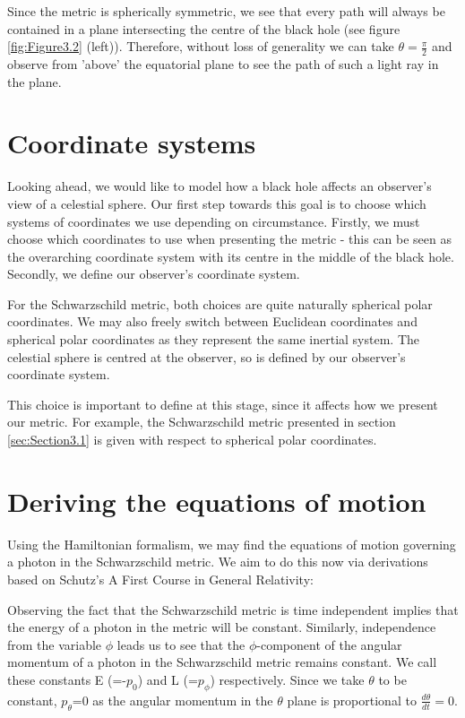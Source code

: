 \documentclass[oneside,openright,frontopenright, singlespacing]{dmathesis}
\begin{document}
	Since the metric is spherically symmetric, we see that every path will always be contained in a plane intersecting the centre of the black hole (see figure \ref{fig:Figure3.2} (left)). Therefore, without loss of generality we can take ${\theta}=\frac{\pi}{2}$ and observe from 'above’ the equatorial plane to see the path of such a light ray in the plane.

\section{Coordinate systems}\label{sec:Section3.2}

	Looking ahead, we would like to model how a black hole affects an observer's view of a celestial sphere. Our first step towards this goal is to choose which systems of coordinates we use depending on circumstance. Firstly, we must choose which coordinates to use when presenting the metric - this can be seen as the overarching coordinate system with its centre in the middle of the black hole. Secondly, we define our observer's coordinate system.

\vspace{1em}
	For the Schwarzschild metric, both choices are quite naturally spherical polar coordinates. We may also freely switch between Euclidean coordinates and spherical polar coordinates as they represent the same inertial system. The celestial sphere is centred at the observer, so is defined by our observer's coordinate system.

\vspace{1em}
	This choice is important to define at this stage, since it affects how we present our metric. For example, the Schwarzschild metric presented in section \ref{sec:Section3.1} is given with respect to spherical polar coordinates.

\section{Deriving the equations of motion}\label{sec:Section3.3}
	
	Using the Hamiltonian formalism, we may find the equations of motion governing a photon in the Schwarzschild metric. We aim to do this now via derivations based on Schutz's A First Course in General Relativity\cite[pp. 283-285]{schutz2009first}:

	Observing the fact that the Schwarzschild metric is time independent implies that the energy of a photon in the metric will be constant. Similarly, independence from the variable $\phi$ leads us to see that the $\phi$-component of the angular momentum of a photon in the Schwarzschild metric remains constant. We call these constants E (=-$p_0$) and L (=$p_\phi$) respectively. Since we take ${\theta}$ to be constant, $p_\theta$=0 as the angular momentum in the $\theta$ plane is proportional to $\frac{d\theta}{dt}=0$.
\end{document}
